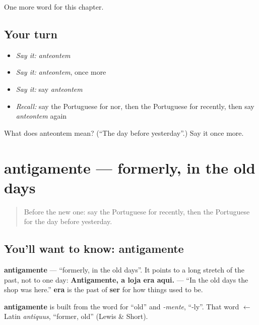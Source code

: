 \begin{grammarlens}[title={What you've built}]
One more word for this chapter.
\end{grammarlens}

\subsection*{Your turn}
\begin{itemize}
\raggedright
  \item \emph{Say it:} \emph{anteontem}
  \item \emph{Say it:} \emph{anteontem}, once more
  \item \emph{Say it:} say \emph{anteontem}
  \item \emph{Recall:} say the Portuguese for nor, then the Portuguese for recently, then say \emph{anteontem} again
\end{itemize}

\begin{tcolorbox}[breakable,colback=teal!4,colframe=teal!35!black,title={Before you move on}]
What does anteontem mean? (\textquotedblleft{}The day before yesterday\textquotedblright{}.) Say it once more.
\end{tcolorbox}
\section[antigamente]{antigamente — formerly, in the old days}

\label{lesson:PT-C135-antigamente}



\begin{quote}
Before the new one: say the Portuguese for recently, then the Portuguese for the day before yesterday.
\end{quote}

\subsection*{You'll want to know: antigamente}
\textbf{antigamente} — \textquotedblleft{}formerly, in the old days\textquotedblright{}. It points to a long stretch of the past, not to one day: \textbf{Antigamente, a loja era aqui.} — \textquotedblleft{}In the old days the shop was here.\textquotedblright{} \textbf{era} is the past of \textbf{ser} for how things used to be.

\begin{cousinweb}
\textbf{antigamente} is built from the word for \textquotedblleft{}old\textquotedblright{} and \emph{-mente}, \textquotedblleft{}-ly\textquotedblright{}. That word $\leftarrow$ Latin \emph{antiquus}, \textquotedblleft{}former, old\textquotedblright{} (Lewis \& Short).
\end{cousinweb}

